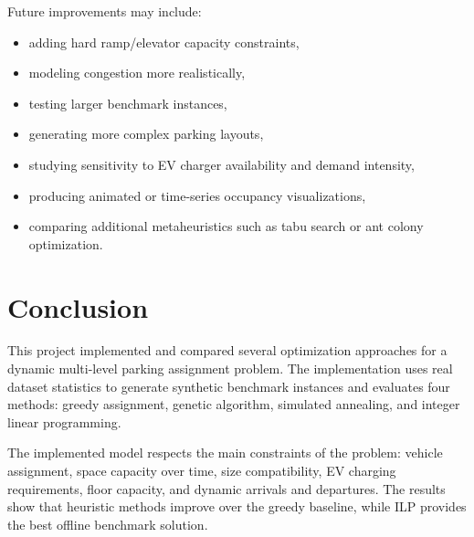 \documentclass[12pt,a4paper]{article}
\begin{document}
Future improvements may include:

\begin{itemize}
    \item adding hard ramp/elevator capacity constraints,
    \item modeling congestion more realistically,
    \item testing larger benchmark instances,
    \item generating more complex parking layouts,
    \item studying sensitivity to EV charger availability and demand intensity,
    \item producing animated or time-series occupancy visualizations,
    \item comparing additional metaheuristics such as tabu search or ant colony optimization.
\end{itemize}

\section{Conclusion}

This project implemented and compared several optimization approaches for a dynamic multi-level parking assignment problem. The implementation uses real dataset statistics to generate synthetic benchmark instances and evaluates four methods: greedy assignment, genetic algorithm, simulated annealing, and integer linear programming.

The implemented model respects the main constraints of the problem: vehicle assignment, space capacity over time, size compatibility, EV charging requirements, floor capacity, and dynamic arrivals and departures. The results show that heuristic methods improve over the greedy baseline, while ILP provides the best offline benchmark solution.
\end{document}
